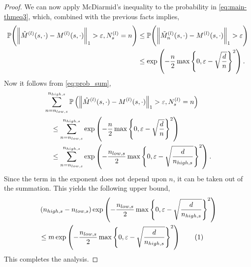 \documentclass[opre,sglanonrev]{informs4}
\numberwithin{equation}{section}
\newcommand{\pow}[1]{^{(#1)}}
\newcommand{\lp}{\left(}
\newcommand{\rp}{\right)}
\newcommand{\Pbb}{\mathbb{P}}
\newcommand{\hatmls}{\Hat{M}^{(l)}(s,\cdot)}
\newcommand{\mls}{{M}^{(l)}(s,\cdot)}
\newcommand\numberthis{\addtocounter{equation}{1}\tag{\theequation}}
\newcommand{\prob}{\Pbb}
\newcommand{\eps}{\varepsilon}
\renewcommand{\epsilon}{\eps}
\begin{document}
\begin{APPENDICES}
\begin{proof}
We can now apply McDiarmid's inequality \citep[Equation 1.3]{rio2013mcdiarmid} to the probability in \cref{eq:main-thmeq3}, which, combined with the previous facts implies,
\begin{align*}
    \prob\Bigg(\bigg\|\hatmls  -\mls\bigg\|_1 > \epsilon, N_s^{(l)}=n \Bigg) & \leq \prob\Bigg(\bigg\|\tilde M_n\pow{l}(s,\cdot) -\mls\bigg\|_1 > \epsilon \Bigg) \\
    & \leq \exp\left(-\frac{n}{2}\max\left\{0, \epsilon-\sqrt{\frac{d}{n}}\right\}^2\right).
\end{align*}
Now it follows from \cref{eq:prob_sum}, 
\begin{align*}
    & \sum_{n=n_{low,s}}^{n_{high,s}} \prob\left(\left\|\hatmls-\mls\right\|_1 > \epsilon, N_s^{(l)}=n \right) \\
    & \quad \leq \sum_{n=n_{low,s}}^{n_{high,s}}  \exp\left(-\frac{n}{2}\max\left\{0,\epsilon-\sqrt{\frac{d}{n}}\right\}^2\right)\\
    & \quad \leq \sum_{n=n_{low,s}}^{n_{high,s}} \exp\left({-\frac{n_{low,s}}{2} \max \left\{0,\epsilon-\sqrt{\frac{d}{n_{high,s}}}\right\}^2}\right).
\end{align*}
Since the term in the exponent does not depend upon $n$, it can be taken out of the summation. This yields the following upper bound,
\begin{align*}
    &  \lp n_{high,s}-n_{low,s} \rp\exp\left({-\frac{n_{low,s}}{2} \max \left\{0,\epsilon-\sqrt{\frac{d}{n_{high,s}}}\right\}^2}\right)\\
    &\leq m\exp\left({-\frac{n_{low,s}}{2} \max \left\{0,\epsilon-\sqrt{\frac{d}{n_{high,s}}}\right\}^2}\right)\numberthis~\label{eq:t1bound}
\end{align*}
This completes the analysis.
\end{proof}




\end{APPENDICES}
\end{document}
